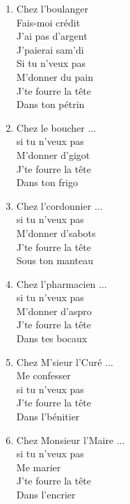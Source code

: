 \documentclass{novel}
\begin{document}
\begin{multicols}{2}
\begin{enumerate}
\item Chez l'boulanger \\
Fais-moi crédit \\
J'ai pas d'argent \\
J'paierai sam'di \\
Si tu n'veux pas \\
M'donner du pain \\
J'te fourre la tête \\
Dans ton pétrin \\

\item Chez le boucher ... \\
si tu n’veux pas \\
M'donner d'gigot \\
J'te fourre la tête \\
Dans ton frigo \\

\item Chez l'cordonnier ... \\
si tu n’veux pas \\
M'donner d'sabots \\
J'te fourre la tête \\
Sous ton manteau \\

\item Chez l'pharmacien ... \\
si tu n’veux pas \\
M'donner d'aspro \\
J'te fourre la tête \\
Dans tes bocaux \\

\item Chez M'sieur l'Curé ... \\
Me confesser \\
si tu n’veux pas \\
J'te fourre la tête \\
Dans l'bénitier \\

\item Chez Monsieur l'Maire ... \\
si tu n’veux pas \\
Me marier \\
J'te fourre la tête \\
Dans l'encrier
\end{enumerate}
\end{multicols}
\end{document}
